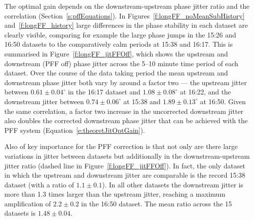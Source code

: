 The optimal gain depends on the downstream-upstream phase jitter ratio and the correlation (Section~\ref{s:pffEquations}). In Figures~\ref{f:longFF_noMeanSubHistory} and~\ref{f:longFF_history} large differences in the phase stability in each dataset are clearly visible, comparing for example the large phase jumps in the 15:26 and 16:50 datasets to the comparatively calm periods at 15:38 and 16:17. This is summarised in Figure~\ref{f:longFF_jitFFOff}, which shows the upstream and downstream (PFF off) phase jitter across the 5--10 minute time period of each dataset. Over the course of the data taking period the mean upstream and downstream phase jitter both vary by around a factor two --- the upstream jitter between \(0.61\pm0.04^\circ\) in the 16:17 dataset and \(1.08\pm0.08^\circ\) at 16:22, and the downstream jitter between \(0.74\pm0.06^\circ\) at 15:38 and \(1.89\pm0.13^\circ\) at 16:50. Given the same correlation, a factor two increase in the uncorrected downstream jitter also doubles the corrected downstream phase jitter that can be achieved with the PFF system (Equation~\ref{e:theoretJitOptGain}).

Also of key importance for the PFF correction is that not only are there large variations in jitter between datasets but additionally in the downstream-upstream jitter ratio (dashed line in Figure~\ref{f:longFF_jitFFOff}). In fact, the only dataset in which the upstream and downstream jitter are comparable is the record 15:38 dataset (with a ratio of \(1.1\pm0.1\)). In all other datasets the downstream jitter is more than 1.3 times larger than the upstream jitter, reaching a maximum amplification of \(2.2\pm0.2\) in the 16:50 dataset. The mean ratio across the 15 datasets is \(1.48\pm0.04\).



